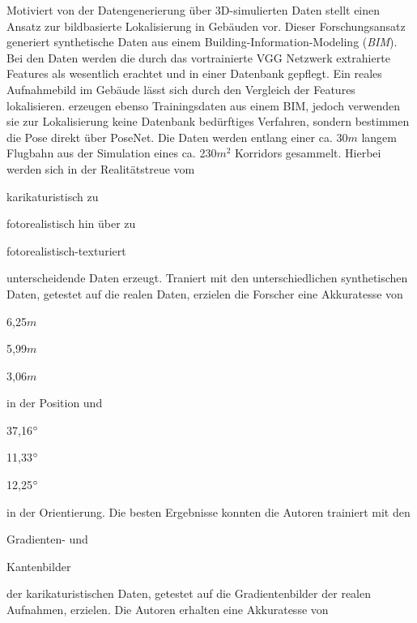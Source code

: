 Motiviert von der Datengenerierung über 3D-simulierten Daten stellt \citet{haImagebasedIndoorLocalization2018} einen Ansatz zur bildbasierte Lokalisierung in Gebäuden vor. Dieser Forschungsansatz generiert synthetische Daten aus einem Building-Information-Modeling (\textit{BIM}). Bei den Daten werden die durch das vortrainierte VGG Netzwerk \cite{simonyanVeryDeepConvolutional2014} extrahierte Features als wesentlich erachtet und in einer Datenbank gepflegt. Ein reales Aufnahmebild im Gebäude lässt sich durch den Vergleich der Features lokalisieren. \citet{acharyaBIMPoseNetIndoorCamera2019, acharyaMODELLINGUNCERTAINTYSINGLE2019} erzeugen ebenso Trainingsdaten aus einem BIM, jedoch verwenden sie zur Lokalisierung keine Datenbank bedürftiges Verfahren, sondern bestimmen die Pose direkt über PoseNet. Die Daten werden entlang einer ca. 30$m$ langem Flugbahn aus der Simulation eines ca. 230$m^2$  Korridors gesammelt. Hierbei werden sich in der Realitätstreue vom \begin{enumerate*}[label=\alph*)]
	\item karikaturistisch zu
	\item fotorealistisch hin über zu
	\item fotorealistisch-texturiert
\end{enumerate*} unterscheidende Daten erzeugt.
Traniert mit den unterschiedlichen synthetischen Daten, getestet auf die realen Daten, erzielen die Forscher eine Akkuratesse von
\begin{enumerate*}[label=\alph*)]
	\item 6,25$m$
	\item 5,99$m$
	\item 3,06$m$
\end{enumerate*}
 in der Position und  
 \begin{enumerate*}[label=\alph*)]
 	\item 37,16$\degree$
 	\item 11,33$\degree$
 	\item 12,25$\degree$
 \end{enumerate*}
 in der Orientierung.
Die besten Ergebnisse konnten die Autoren trainiert mit den 
\begin{enumerate*}[label=\alph*)]
	\addtocounter{enumi}{3}
	\item Gradienten- und
	\item Kantenbilder
\end{enumerate*} der karikaturistischen Daten, getestet auf die Gradientenbilder der realen Aufnahmen, erzielen. Die Autoren erhalten eine Akkuratesse von 
